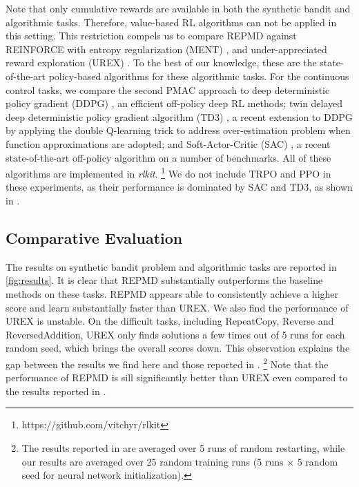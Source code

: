 Note that only cumulative rewards are available in both the
synthetic bandit and algorithmic tasks.
Therefore, value-based RL algorithms can not be applied in this setting.
This restriction compels us to compare REPMD against
REINFORCE with entropy regularization (MENT) \citep{williams1992simple},
and under-appreciated reward exploration (UREX) \citep{nachum2017improving}.
To the best of our knowledge,
these
are the state-of-the-art policy-based algorithms for these algorithmic tasks. 
%
For the continuous control tasks, we compare the second PMAC approach
to deep deterministic policy gradient (DDPG) \citep{lillicrap2015continuous},
an efficient off-policy deep RL methods;
twin delayed deep deterministic policy gradient algorithm (TD3)
\citep{fujimoto2018addressing},
a recent extension to DDPG by applying the double Q-learning trick
to address over-estimation problem when function approximations are adopted;
and Soft-Actor-Critic (SAC) \citep{haarnoja2018soft},
a recent state-of-the-art off-policy algorithm on a number of benchmarks.
All of these algorithms are implemented in \emph{rlkit}.%
%
\footnote{
https://github.com/vitchyr/rlkit
} 
We do not include TRPO and PPO in these experiments,
as their performance is dominated by SAC and TD3,
as shown in \citep{haarnoja2018soft,fujimoto2018addressing}. 


\subsection{Comparative Evaluation}
\label{subsec:compeval}
The results on synthetic bandit problem and algorithmic tasks are reported 
in \cref{fig:results}. 
It is clear that REPMD substantially outperforms the baseline methods
on these tasks.
REPMD appears able to consistently achieve a higher score and
learn substantially faster than UREX.
We also find the performance of UREX is unstable.
On the difficult tasks, including RepeatCopy, Reverse and ReversedAddition,
UREX only finds solutions a few times out of 5 runs for each random seed,
which brings the overall scores down.
This observation explains the gap between the results we find here
and those reported in \citet{nachum2017improving}.%
%
\footnote{
The results reported in \citep{nachum2017improving} are averaged over 
5 runs of random restarting,
while our results are averaged over 25 random training runs
(5 runs $\times$ 5 random seed for neural network initialization). 
}
Note that the performance of REPMD is sill significantly better than
UREX even compared to the results reported in \citet{nachum2017improving}. 

